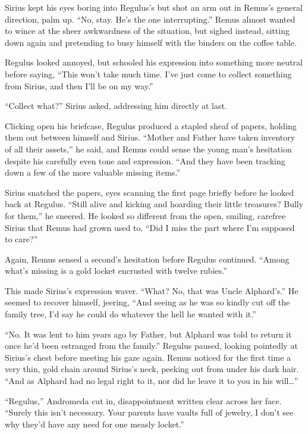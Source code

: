 Sirius kept his eyes boring into Regulus’s but shot an arm out in Remus’s general direction, palm up. “No, stay. He’s the one interrupting.” Remus almost wanted to wince at the sheer awkwardness of the situation, but sighed instead, sitting down again and pretending to busy himself with the binders on the coffee table.

Regulus looked annoyed, but schooled his expression into something more neutral before saying, “This won’t take much time. I’ve just come to collect something from Sirius, and then I’ll be on my way.”

“Collect what?” Sirius asked, addressing him directly at last.

Clicking open his briefcase, Regulus produced a stapled sheaf of papers, holding them out between himself and Sirius. “Mother and Father have taken inventory of all their assets,” he said, and Remus could sense the young man’s hesitation despite his carefully even tone and expression. “And they have been tracking down a few of the more valuable missing items.”

Sirius snatched the papers, eyes scanning the first page briefly before he looked back at Regulus. “Still alive and kicking and hoarding their little treasures? Bully for them,” he sneered. He looked so different from the open, smiling, carefree Sirius that Remus had grown used to. “Did I miss the part where I’m supposed to care?”

Again, Remus sensed a second’s hesitation before Regulus continued. “Among what’s missing is a gold locket encrusted with twelve rubies.”

This made Sirius’s expression waver. “What? No, that was Uncle Alphard’s.” He seemed to recover himself, jeering, “And seeing as he was so kindly cut off the family tree, I’d say he could do whatever the hell he wanted with it.”

“No. It was lent to him years ago by Father, but Alphard was told to return it once he’d been estranged from the family.” Regulus paused, looking pointedly at Sirius’s chest before meeting his gaze again. Remus noticed for the first time a very thin, gold chain around Sirius’s neck, peeking out from under his dark hair. “And as Alphard had no legal right to it, nor did he leave it to you in his will…”

“Regulus,” Andromeda cut in, disappointment written clear across her face. “Surely this isn’t necessary. Your parents have vaults full of jewelry, I don’t see why they’d have any need for one measly locket.”

